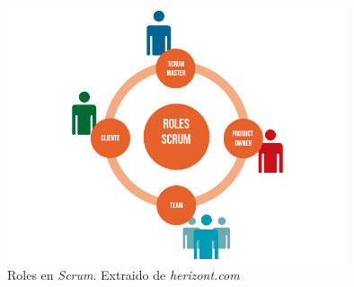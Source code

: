 \begin{figure}[H]
    \centering
    \includegraphics[width=10cm]{Images/roles.png}
    \caption{Roles en \textit{Scrum}. Extraido de \textit{herizont.com} \autocite*{ScrumRoles}}
\end{figure}